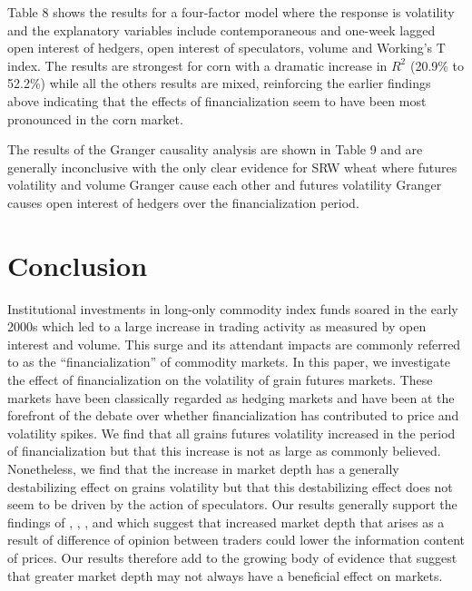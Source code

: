 \documentclass[
]{book}
\begin{document}
Table 8 shows the results for a four-factor model where the response is volatility and the explanatory variables include contemporaneous and one-week lagged open interest of hedgers, open interest of speculators, volume and Working's T index. The results are strongest for corn with a dramatic increase in \(R^{2}\) (20.9\% to 52.2\%) while all the others results are mixed, reinforcing the earlier findings above indicating that the effects of financialization seem to have been most pronounced in the corn market.

The results of the Granger causality analysis are shown in Table 9 and are generally inconclusive with the only clear evidence for SRW wheat where futures volatility and volume Granger cause each other and futures volatility Granger causes open interest of hedgers over the financialization period.

\hypertarget{conclusions}{%
\chapter{Conclusion}\label{conclusions}}

Institutional investments in long-only commodity index funds soared in the early 2000s which led to a large increase in trading activity as measured by open interest and volume. This surge and its attendant impacts are commonly referred to as the ``financialization'' of commodity markets. In this paper, we investigate the effect of financialization on the volatility of grain futures markets. These markets have been classically regarded as hedging markets and have been at the forefront of the debate over whether financialization has contributed to price and volatility spikes. We find that all grains futures volatility increased in the period of financialization but that this increase is not as large as commonly believed. Nonetheless, we find that the increase in market depth has a generally destabilizing effect on grains volatility but that this destabilizing effect does not seem to be driven by the action of speculators. Our results generally support the findings of \citet{stein_informational_1987}, \citet{goldstein_speculation_2014}, \citet{singleton_investor_2013}, and \citet{sockin_informational_2015} which suggest that increased market depth that arises as a result of difference of opinion between traders could lower the information content of prices. Our results therefore add to the growing body of evidence that suggest that greater market depth may not always have a beneficial effect on markets.

  
\end{document}
